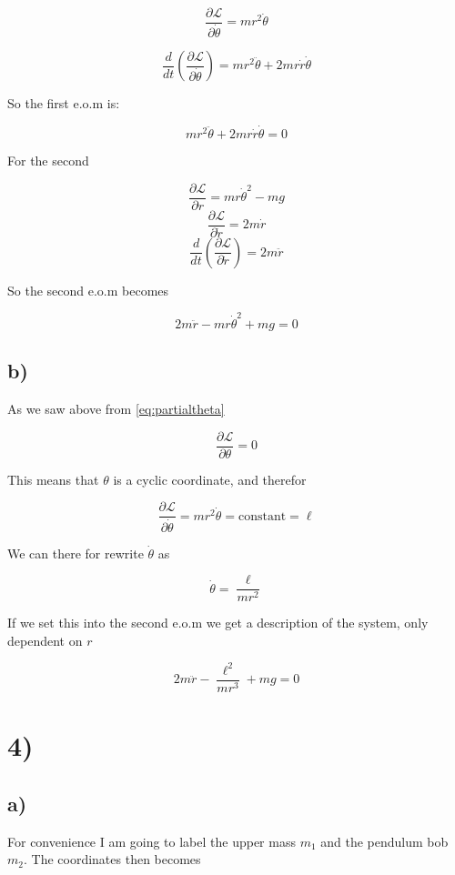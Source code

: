 \documentclass[a4paper,norsk, 10pt]{article}
\begin{document}
\begin{equation}
\frac{\partial \mathcal{L}}{\partial \dot{\theta}} = mr^2\dot{\theta}
\label{eq:partialthetadot}
\end{equation}

$$
\frac{d}{dt}\left(\frac{\partial \mathcal{L}}{\partial \dot{\theta}}\right) = mr^2\ddot{\theta} + 2mr\dot{r}\dot{\theta}
$$

So the first e.o.m is:

$$
mr^2\ddot{\theta} + 2mr\dot{r}\dot{\theta} = 0
$$


For the second

$$
\frac{\partial \mathcal{L}}{\partial r} = mr\dot{\theta}^2 - mg
$$
$$
\frac{\partial \mathcal{L}}{\partial \dot{r}} = 2m\dot{r}
$$
$$
\frac{d}{dt}\left(\frac{\partial \mathcal{L}}{\partial \dot{r}}\right) = 2m\ddot{r}
$$

So the second e.o.m becomes

$$
2m\ddot{r} - mr\dot{\theta}^2 + mg = 0
$$

\subsection*{b)}

As we saw above from \ref{eq:partialtheta}

$$
\frac{\partial \mathcal{L}}{\partial \theta} = 0
$$

This means that $\theta$ is a cyclic coordinate, and therefor


$$
\frac{\partial \mathcal{L}}{\partial \dot{\theta}} = mr^2\dot{\theta} = \mathrm{constant} = \ell
$$

We can there for rewrite $\dot{\theta}$ as 

$$
\dot{\theta} = \frac{\ell}{mr^2}
$$

If we set this into the second e.o.m we get a description of the system, only dependent on $r$

$$
2m\ddot{r} - \frac{\ell ^2}{mr^3} + mg = 0
$$

\section*{4)}
\subsection*{a)}

For convenience I am going to label the upper mass $m_1$ and the pendulum bob $m_2$. The coordinates then becomes
\end{document}
